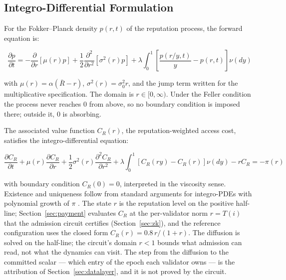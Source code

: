 \documentclass[11pt,a4paper]{article}
\numberwithin{equation}{section}
\numberwithin{table}{section}
\begin{document}
\subsection{Integro-Differential Formulation}
For the Fokker--Planck density $p(r, t)$ of the reputation process, the forward equation is:

\begin{equation}
\frac{\partial p}{\partial t} = -\frac{\partial}{\partial r}[\mu(r) p] + \frac{1}{2}\frac{\partial^2}{\partial r^2}[\sigma^2(r) p] + \lambda \int_0^1 \left[\frac{p(r/y, t)}{y} - p(r, t)\right] \nu(dy)
\label{eq:fokker}
\end{equation}

with $\mu(r) = \alpha(\bar{R} - r)$, $\sigma^2(r) = \sigma_0^2 r$, and the jump term written for the multiplicative specification. The domain is $r \in [0, \infty)$. Under the Feller condition the process never reaches $0$ from above, so no boundary condition is imposed there; outside it, $0$ is absorbing.

The associated value function $C_R(r)$, the reputation-weighted access cost, satisfies the integro-differential equation:

\begin{equation}
\frac{\partial C_R}{\partial t} + \mu(r)\frac{\partial C_R}{\partial r} + \frac{1}{2}\sigma^2(r)\frac{\partial^2 C_R}{\partial r^2} + \lambda \int_0^1 [C_R(ry) - C_R(r)] \nu(dy) - r C_R = -\pi(r)
\label{eq:integro}
\end{equation}

with boundary condition $C_R(0) = 0$, interpreted in the viscosity sense. Existence and uniqueness follow from standard arguments for integro-PDEs with polynomial growth of $\pi$ \cite{oksendal2007}. The state $r$ is the reputation level on the positive half-line; Section~\ref{sec:payment} evaluates $C_R$ at the per-validator norm $r = T(i)$ that the admission circuit certifies (Section~\ref{sec:zk}), and the reference configuration uses the closed form $C_R(r) = 0.8 \, r / (1 + r)$. The diffusion is solved on the half-line; the circuit's domain $r < 1$ bounds what admission can read, not what the dynamics can visit. The step from the diffusion to the committed scalar --- which entry of the epoch each validator owns --- is the attribution of Section~\ref{sec:datalayer}, and it is not proved by the circuit.
\end{document}
